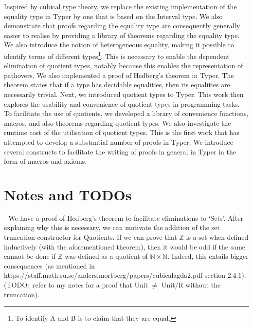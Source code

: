 \documentclass[12pt,twoside,maitrise]{dms}
\theoremstyle{definition}
\numberwithin{equation}{section}
\numberwithin{table}{chapter}
\numberwithin{figure}{chapter}
\begin{document}
Inspired by cubical type theory, we replace the existing implementation of the
equality type in Typer by one that is based on the Interval type. We also
demonstrate that proofs regarding the equality type are consequently generally
easier to realise by providing a library of theorems regarding the equality
type. We also introduce the notion of heterogeneous equality, making it possible
to identify terms of different types\footnote{To identify A and B is to claim
that they are equal.}. This is necessary to enable the dependent elimination of
quotient types, notably because this enables the representation of
pathovers\cite{licata2015cubical}. We also implemented a proof of Hedberg's
theorem\cite{hedberg1998coherence} in Typer. The theorem states that if a type
has decidable equalities, then its equalities are necessarily trivial. Next, we
introduced quotient types to Typer. This work then explores the usability and
convenience of quotient types in programming tasks. To facilitate the use of
quotients, we developed a library of convenience functions, macros, and also
theorems regarding quotient types. We also investigate the runtime cost of the
utilisation of quotient types. This is the first work that has attempted to
develop a substantial number of proofs in Typer. We introduce several constructs
to facilitate the writing of proofs in general in Typer in the form of macros
and axioms.

\section{Notes and TODOs}
- We have a proof of Hedberg's theorem to facilitate eliminations to `Sets'.
After explaining why this is necessary, we can motivate the addition of the set
truncation constructor for Quotients. If we can prove that $\mathbb{Z}$ is a set
when defined inductively (with the aforementioned theorem), then it would be odd
if the same cannot be done if $\mathbb{Z}$ was defined as a quotient of
$\mathbb{N} \times \mathbb{N}$. Indeed, this entails bigger consequences (as
mentioned in https://staff.math.su.se/anders.mortberg/papers/cubicalagda2.pdf
section 2.4.1). (TODO:\ refer to my notes for a proof that Unit $\ne$ Unit/R
without the truncation).

\end{document}
